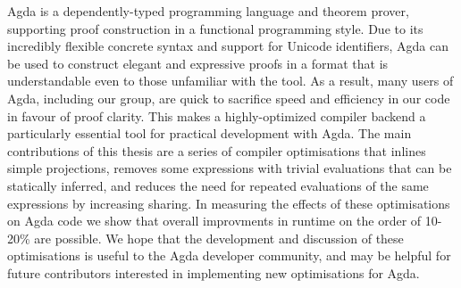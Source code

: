 Agda is a dependently-typed programming language and theorem prover, supporting proof construction in a functional programming style. Due to its incredibly flexible concrete syntax and support for Unicode identifiers, Agda can be used to construct elegant and expressive proofs in a format that is understandable even to those unfamiliar with the tool. As a result, many users of Agda, including our group, are quick to sacrifice speed and efficiency in our code in favour of proof clarity. This makes a highly-optimized compiler backend a particularly essential tool for practical development with Agda. The main contributions of this thesis are a series of compiler optimisations that inlines simple projections, removes some expressions with trivial evaluations that can be statically inferred, and reduces the need for repeated evaluations of the same expressions by increasing sharing. In measuring the effects of these optimisations on Agda code we show that overall improvments in runtime on the order of 10-20\% are possible. We hope that the development and discussion of these optimisations is useful to the Agda developer community, and may be helpful for future contributors interested in implementing new optimisations for Agda.
